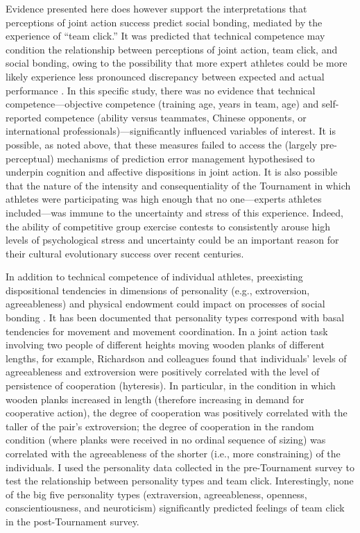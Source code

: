   Evidence presented here does however support the interpretations that perceptions of joint action success predict social bonding, mediated by the experience of ``team click.'' It was predicted that technical competence may condition the relationship between perceptions of joint action, team click, and social bonding, owing to the possibility that more expert athletes could be more likely experience less pronounced discrepancy between expected and actual performance \cite{Tomeo2012}.  In this specific study, there was no evidence that technical competence---objective competence (training age, years in team, age) and self-reported competence (ability versus teammates, Chinese opponents, or international professionals)---significantly influenced variables of interest.  It is possible, as noted above, that these measures failed to access the (largely pre-perceptual) mechanisms of prediction error management hypothesised to underpin cognition and affective dispositions in joint action.  It is also possible that the nature of the intensity and consequentiality of the Tournament in which athletes were participating was high enough that no one---experts athletes included---was immune to the uncertainty and stress of this experience. Indeed, the ability of competitive group exercise contests to consistently arouse high levels of psychological stress and uncertainty could be an important reason for their cultural evolutionary success over recent centuries.

  In addition to technical competence of individual athletes, preexisting dispositional tendencies in dimensions of personality (e.g., extroversion, agreeableness) and physical endowment could impact on processes of social bonding \citep{Marsh2009,VonRueden2015}.   It has been documented that personality types correspond with basal tendencies for movement and movement coordination. In a joint action task involving two people of different heights moving wooden planks of different lengths, for example, Richardson and colleagues \textcite{Richardson2007} found that individuals’ levels of agreeableness and extroversion were positively correlated with the level of persistence of cooperation (hyteresis).  In particular, in the condition in which wooden planks increased in length (therefore increasing in demand for cooperative action), the degree of cooperation was positively correlated with the taller of the pair’s extroversion; the degree of cooperation in the random condition (where planks were received in no ordinal sequence of sizing) was correlated with the agreeableness of the shorter (i.e., more constraining) of the individuals.  I used the personality data collected in the pre-Tournament survey to test the relationship between personality types and team click. Interestingly, none of the big five personality types (extraversion, agreeableness, openness, conscientiousness, and neuroticism) significantly predicted feelings of team click in the post-Tournament survey.

